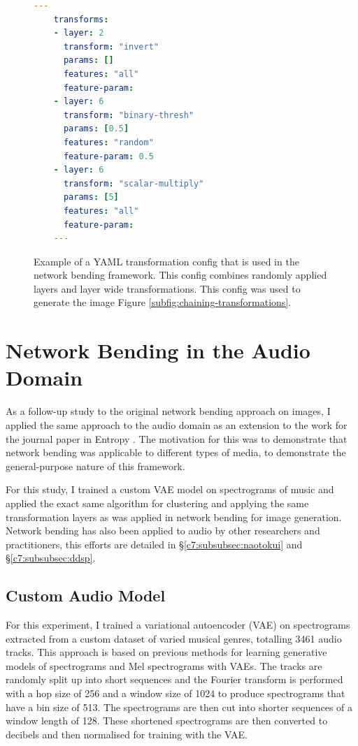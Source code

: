  \begin{figure}[!htb]
 \begin{lstlisting}[language=yaml]
    ---
    transforms:
    - layer: 2
      transform: "invert"
      params: []
      features: "all"
      feature-param: 
    - layer: 6
      transform: "binary-thresh"
      params: [0.5]
      features: "random"
      feature-param: 0.5
    - layer: 6
      transform: "scalar-multiply"
      params: [5]
      features: "all"
      feature-param: 
    ---
    \end{lstlisting}
    \caption[Example YAML transformation config]{Example of a YAML transformation config that is used in the network bending framework. This config combines randomly applied layers and layer wide transformations. This config was used to generate the image Figure \ref{subfig:chaining-transformations}.}
    \label{fig:c5:yaml-transform-config}
 \end{figure}

\section{Network Bending in the Audio Domain}
\label{c5:sec:net-bend-audio}

As a follow-up study to the original network bending approach on images, I applied the same approach to the audio domain as an extension to the work for the journal paper in Entropy \citep{broad2022network}. 
The motivation for this was to demonstrate that network bending was applicable to different types of media, to demonstrate the general-purpose nature of this framework. 

For this study, I trained a custom VAE model on spectrograms of music and applied the exact same algorithm for clustering and applying the same transformation layers as was applied in network bending for image generation. 
Network bending has also been applied to audio by other researchers and practitioners, this efforts are detailed in \S \ref{c7:subsubsec:naotokui} and \S \ref{c7:subsubsec:ddsp}.

\subsection{Custom Audio Model}

For this experiment, I trained a variational autoencoder (VAE) \citep{kingma2013auto,rezende2014stochastic} on spectrograms extracted from a custom dataset of varied musical genres, totalling 3461 audio tracks. This approach is based on previous methods for learning generative models of spectrograms \citep{akten2018granma} and Mel spectrograms \citep{valenzuela2021melspecvae} with VAEs. The tracks are randomly split up into short sequences and the Fourier transform is performed with a hop size of 256 and a window size of 1024 to produce spectrograms that have a bin size of 513. The spectrograms are then cut into shorter sequences of a window length of 128. These shortened spectrograms are then converted to decibels and then normalised for training with the VAE.  

